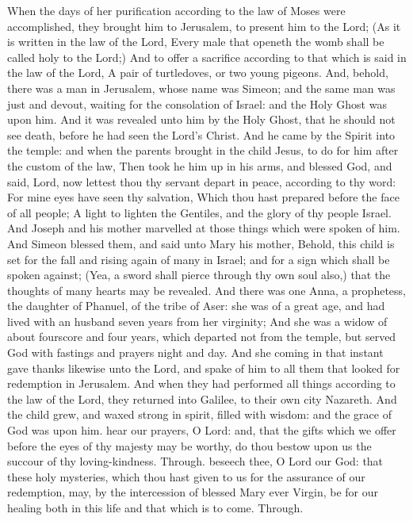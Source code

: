  When the days of her purification according to the law of Moses were accomplished, they brought him to Jerusalem, to present him to the Lord; (As it is written in the law of the Lord, Every male that openeth the womb shall be called holy to the Lord;) And to offer a sacrifice according to that which is said in the law of the Lord, A pair of turtledoves, or two young pigeons. And, behold, there was a man in Jerusalem, whose name was Simeon; and the same man was just and devout, waiting for the consolation of Israel: and the Holy Ghost was upon him. And it was revealed unto him by the Holy Ghost, that he should not see death, before he had seen the Lord's Christ. And he came by the Spirit into the temple: and when the parents brought in the child Jesus, to do for him after the custom of the law, Then took he him up in his arms, and blessed God, and said, Lord, now lettest thou thy servant depart in peace, according to thy word: For mine eyes have seen thy salvation, Which thou hast prepared before the face of all people; A light to lighten the Gentiles, and the glory of thy people Israel. And Joseph and his mother marvelled at those things which were spoken of him. And Simeon blessed them, and said unto Mary his mother, Behold, this child is set for the fall and rising again of many in Israel; and for a sign which shall be spoken against; (Yea, a sword shall pierce through thy own soul also,) that the thoughts of many hearts may be revealed. And there was one Anna, a prophetess, the daughter of Phanuel, of the tribe of Aser: she was of a great age, and had lived with an husband seven years from her virginity; And she was a widow of about fourscore and four years, which departed not from the temple, but served God with fastings and prayers night and day. And she coming in that instant gave thanks likewise unto the Lord, and spake of him to all them that looked for redemption in Jerusalem. And when they had performed all things according to the law of the Lord, they returned into Galilee, to their own city Nazareth. And the child grew, and waxed strong in spirit, filled with wisdom: and the grace of God was upon him.
\secret
{} hear our prayers, O Lord: and, that the gifts which we offer before the eyes of thy majesty may be worthy, do thou bestow upon us the succour of thy loving-kindness. Through.
\postcommunion
{} beseech thee, O Lord our God: that these holy mysteries, which thou hast given to us for the assurance of our redemption, may, by the intercession of blessed Mary ever Virgin, be for our healing both in this life and that which is to come. Through.

